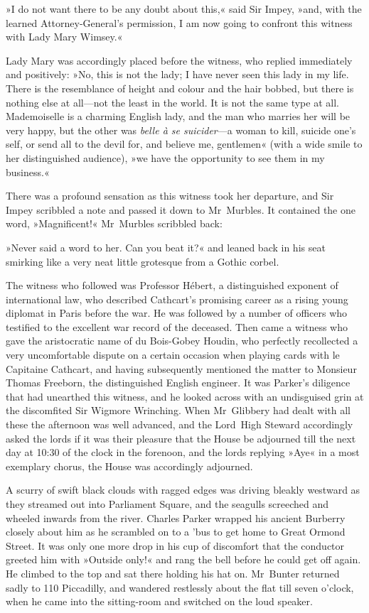 »I do not want there to be any doubt about this,« said Sir Impey, »and, with the learned Attorney-General's permission, I am now going to confront this witness with Lady Mary Wimsey.«

Lady Mary was accordingly placed before the witness, who replied immediately and positively: »No, this is not the lady; I have never seen this lady in my life. There is the resemblance of height and colour and the hair bobbed, but there is nothing else at all—not the least in the world. It is not the same type at all. Mademoiselle is a charming English lady, and the man who marries her will be very happy, but the other was \textit{belle à se suicider}—a woman to kill, suicide one's self, or send all to the devil for, and believe me, gentlemen« (with a wide smile to her distinguished audience), »we have the opportunity to see them in my business.«

There was a profound sensation as this witness took her departure, and Sir Impey scribbled a note and passed it down to Mr~Murbles. It contained the one word, »Magnificent!« Mr~Murbles scribbled back:

»Never said a word to her. Can you beat it?« and leaned back in his seat smirking like a very neat little grotesque from a Gothic corbel.

The witness who followed was Professor Hébert, a distinguished exponent of international law, who described Cathcart's promising career as a rising young diplomat in Paris before the war. He was followed by a number of officers who testified to the excellent war record of the deceased. Then came a witness who gave the aristocratic name of du Bois-Gobey Houdin, who perfectly recollected a very uncomfortable dispute on a certain occasion when playing cards with le Capitaine Cathcart, and having subsequently mentioned the matter to Monsieur Thomas Freeborn, the distinguished English engineer. It was Parker's diligence that had unearthed this witness, and he looked across with an undisguised grin at the discomfited Sir Wigmore Wrinching. When Mr~Glibbery had dealt with all these the afternoon was well advanced, and the Lord~High Steward accordingly asked the lords if it was their pleasure that the House be adjourned till the next day at 10:30 of the clock in the forenoon, and the lords replying »Aye« in a most exemplary chorus, the House was accordingly adjourned.

A scurry of swift black clouds with ragged edges was driving bleakly westward as they streamed out into Parliament Square, and the seagulls screeched and wheeled inwards from the river. Charles Parker wrapped his ancient Burberry closely about him as he scrambled on to a 'bus to get home to Great Ormond Street. It was only one more drop in his cup of discomfort that the conductor greeted him with »Outside only!« and rang the bell before he could get off again. He climbed to the top and sat there holding his hat on. Mr~Bunter returned sadly to 110 Piccadilly, and wandered restlessly about the flat till seven o'clock, when he came into the sitting-room and switched on the loud speaker.

